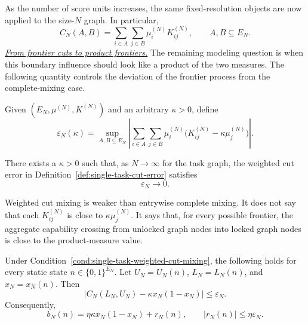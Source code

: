 As the number of score units increases, the same fixed-resolution objects are now applied to the size-$N$ graph. In particular,
\begin{equation*}
    C_N(A,B)=\sum_{i\in A}\sum_{j\in B}\mu_i^{(N)}K_{ij}^{(N)},
    \qquad A,B\subseteq E_N.
\end{equation*}
\underline{\textit{From frontier cuts to product frontiers.}}
The remaining modeling question is when this boundary influence should look like a product of the two measures. The following quantity controls the deviation of the frontier process from the complete-mixing case.

\begin{definition}
\label{def:single-task-cut-error}
Given $(E_N,\mu^{(N)},K^{(N)})$ and an arbitrary $\kappa>0$, define
\begin{equation*}
    \varepsilon_N(\kappa)=
    \sup_{A,B\subseteq E_N}
    \left|
    \sum_{i\in A}\sum_{j\in B}
    \mu_i^{(N)}\bigl(K_{ij}^{(N)}-\kappa\mu_j^{(N)}\bigr)
    \right|.
\end{equation*}
\end{definition}

\begin{condition}
\label{cond:single-task-weighted-cut-mixing}
There exists a \(\kappa > 0\) such that, as $N\to\infty$ for the task graph, the weighted cut error in Definition~\ref{def:single-task-cut-error} satisfies
\begin{equation*}
    \varepsilon_N\to0.
\end{equation*}
\end{condition}

Weighted cut mixing is weaker than entrywise complete mixing. It does not say that each $K_{ij}^{(N)}$ is close to $\kappa\mu_j^{(N)}$. It says that, for every possible frontier, the aggregate capability crossing from unlocked graph nodes into locked graph nodes is close to the product-measure value.

\begin{lemma}
\label{lem:cut-mixing-logistic-growth}
Under Condition~\ref{cond:single-task-weighted-cut-mixing}, the following holds for every static state $n\in\{0,1\}^{E_N}$. Let $U_N=U_N(n)$, $L_N=L_N(n)$, and $x_N=x_N(n)$. Then
\begin{equation*}
    \left|C_N(L_N,U_N)-\kappa x_N(1-x_N)\right|\le\varepsilon_N.
\end{equation*}
Consequently,
\begin{equation*}
    b_N(n)=\eta\kappa x_N(1-x_N)+r_N(n),
    \qquad |r_N(n)|\le\eta\varepsilon_N.
\end{equation*}
\end{lemma}

